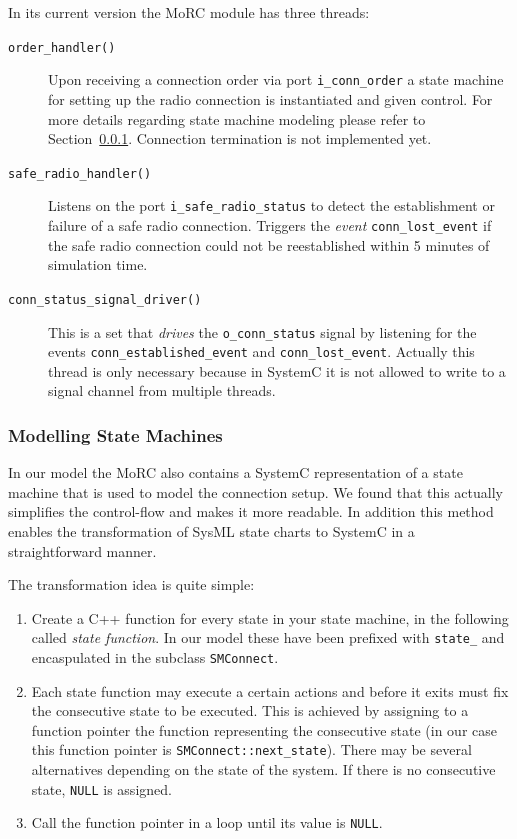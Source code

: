 \documentclass{template/openetcs_article}
\begin{document}
In its current version the MoRC module has three threads:
\begin{description}
  \item[\tt order\_handler()] Upon receiving a connection order via port \texttt{i\_conn\_order} a state machine for setting up the radio connection is instantiated and given control. For more details regarding state machine modeling please refer to Section~\ref{sct:modellingsm}. Connection termination is not implemented yet.
  \item[\tt safe\_radio\_handler()] Listens on the port \texttt{i\_safe\_radio\_status} to detect the establishment or failure of a safe radio connection. Triggers the \emph{event} \verb|conn_lost_event| if the safe radio connection could not be reestablished within 5 minutes of simulation time.
  \item[\tt conn\_status\_signal\_driver()] This is a set that \emph{drives} the \texttt{o\_conn\_status} signal by listening for the events \verb|conn_established_event| and \verb|conn_lost_event|. Actually this thread is only necessary because in SystemC it is not allowed to write to a signal channel from multiple threads.
\end{description}


\subsubsection{Modelling State Machines}
\label{sct:modellingsm}

In our model the MoRC also contains a SystemC representation of a state machine that is used to model the connection setup. We found that this actually simplifies the control-flow and makes it more readable. In addition this method enables the transformation of SysML state charts to SystemC in a straightforward manner.

The transformation idea is quite simple: 
\begin{enumerate}
  \item Create a C++ function for every state in your state machine, in the following called \emph{state function}. In our model these have been prefixed with \verb|state_| and encaspulated in the subclass \verb|SMConnect|.
  \item Each state function may execute a certain actions and before it exits must fix the consecutive state to be executed. This is achieved by assigning to a function pointer the function representing the consecutive state (in our case this function pointer is \verb|SMConnect::next_state|). There may be several alternatives depending on the state of the system. If there is no consecutive state, \verb|NULL| is assigned.
  \item Call the function pointer in a loop until its value is \verb|NULL|. 
\end{enumerate}
\end{document}
